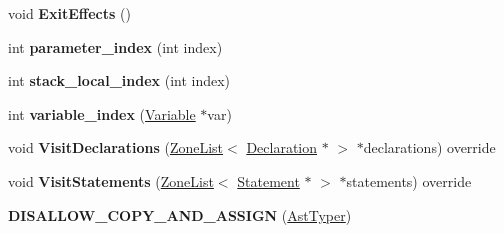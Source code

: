 \begin{DoxyCompactItemize}
\item 
void {\bfseries Exit\+Effects} ()\hypertarget{classv8_1_1internal_1_1_ast_typer_a4af1c0f8559d883050c516dc8b03b3ea}{}\label{classv8_1_1internal_1_1_ast_typer_a4af1c0f8559d883050c516dc8b03b3ea}

\item 
int {\bfseries parameter\+\_\+index} (int index)\hypertarget{classv8_1_1internal_1_1_ast_typer_a0cd8b3c4b5e9dfad46577350cb427ee5}{}\label{classv8_1_1internal_1_1_ast_typer_a0cd8b3c4b5e9dfad46577350cb427ee5}

\item 
int {\bfseries stack\+\_\+local\+\_\+index} (int index)\hypertarget{classv8_1_1internal_1_1_ast_typer_ad127c227a25f3373ac5f1717c0197df4}{}\label{classv8_1_1internal_1_1_ast_typer_ad127c227a25f3373ac5f1717c0197df4}

\item 
int {\bfseries variable\+\_\+index} (\hyperlink{classv8_1_1internal_1_1_variable}{Variable} $\ast$var)\hypertarget{classv8_1_1internal_1_1_ast_typer_a14dfb7c70683fb3d49a32e1dab5bae01}{}\label{classv8_1_1internal_1_1_ast_typer_a14dfb7c70683fb3d49a32e1dab5bae01}

\item 
void {\bfseries Visit\+Declarations} (\hyperlink{classv8_1_1internal_1_1_zone_list}{Zone\+List}$<$ \hyperlink{classv8_1_1internal_1_1_declaration}{Declaration} $\ast$ $>$ $\ast$declarations) override\hypertarget{classv8_1_1internal_1_1_ast_typer_ab0d598688462914105a912cf31f3006f}{}\label{classv8_1_1internal_1_1_ast_typer_ab0d598688462914105a912cf31f3006f}

\item 
void {\bfseries Visit\+Statements} (\hyperlink{classv8_1_1internal_1_1_zone_list}{Zone\+List}$<$ \hyperlink{classv8_1_1internal_1_1_statement}{Statement} $\ast$ $>$ $\ast$statements) override\hypertarget{classv8_1_1internal_1_1_ast_typer_ae6d47805ddbbcc92852c03f4916d28d8}{}\label{classv8_1_1internal_1_1_ast_typer_ae6d47805ddbbcc92852c03f4916d28d8}

\item 
{\bfseries D\+I\+S\+A\+L\+L\+O\+W\+\_\+\+C\+O\+P\+Y\+\_\+\+A\+N\+D\+\_\+\+A\+S\+S\+I\+GN} (\hyperlink{classv8_1_1internal_1_1_ast_typer}{Ast\+Typer})\hypertarget{classv8_1_1internal_1_1_ast_typer_a77cb17503da2bad75331293e8c958839}{}\label{classv8_1_1internal_1_1_ast_typer_a77cb17503da2bad75331293e8c958839}

\end{DoxyCompactItemize}
